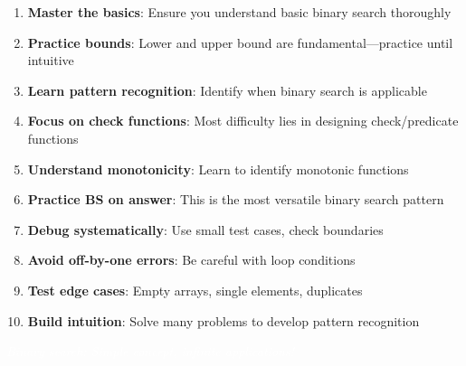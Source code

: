 \documentclass[11pt,a4paper,oneside]{book}
\begin{document}
\begin{tcolorbox}[
    enhanced,
    colback=white,
    colframe=primaryblue,
    boxrule=2pt,
    arc=4mm
]
\begin{enumerate}[leftmargin=*, itemsep=8pt]
    \item \textbf{\textcolor{primaryblue}{Master the basics}}: Ensure you understand basic binary search thoroughly
    
    \item \textbf{\textcolor{primaryblue}{Practice bounds}}: Lower and upper bound are fundamental—practice until intuitive
    
    \item \textbf{\textcolor{primaryblue}{Learn pattern recognition}}: Identify when binary search is applicable
    
    \item \textbf{\textcolor{primaryblue}{Focus on check functions}}: Most difficulty lies in designing check/predicate functions
    
    \item \textbf{\textcolor{primaryblue}{Understand monotonicity}}: Learn to identify monotonic functions
    
    \item \textbf{\textcolor{primaryblue}{Practice BS on answer}}: This is the most versatile binary search pattern
    
    \item \textbf{\textcolor{primaryblue}{Debug systematically}}: Use small test cases, check boundaries
    
    \item \textbf{\textcolor{primaryblue}{Avoid off-by-one errors}}: Be careful with loop conditions
    
    \item \textbf{\textcolor{primaryblue}{Test edge cases}}: Empty arrays, single elements, duplicates
    
    \item \textbf{\textcolor{primaryblue}{Build intuition}}: Solve many problems to develop pattern recognition
\end{enumerate}
\end{tcolorbox}

\vspace{1cm}

\begin{center}
\begin{tcolorbox}[
    enhanced,
    colback=primaryblue,
    colframe=primaryblue,
    boxrule=0pt,
    arc=4mm,
    width=0.8\textwidth
]
\centering
\Large\textcolor{white}{\textit{Binary search: Simple concept, infinite applications!}}
\end{tcolorbox}
\end{center}
\end{document}
